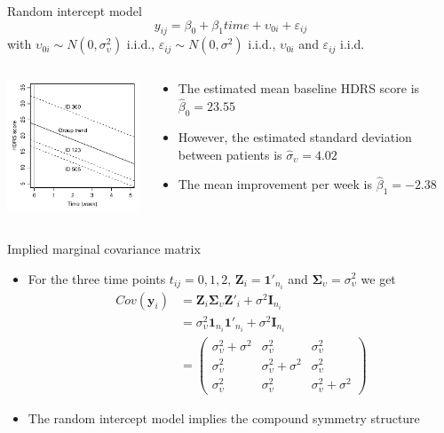 \documentclass[aspectratio=169]{beamer}
\newcommand{\vect}[1]{\mathbf{#1}}
\newcommand{\mat}[1]{\mathbf{#1}}
\newcommand{\gmat}[1]{\boldsymbol{#1}}
\begin{document}
\begin{frame}[fragile]{Random intercept model}
  \[
    y_{ij} = \beta_0 + \beta_1 time + \upsilon_{0i} + \varepsilon_{ij}
  \]
with $\upsilon_{0i} \sim N(0, \sigma^2_{\upsilon})$ i.i.d.,
$\varepsilon_{ij} \sim N(0, \sigma^2)$ i.i.d., $\upsilon_{0i}$ and
$\varepsilon_{ij}$ i.i.d.\\[2ex]
\begin{columns}
\begin{column}{.4\textwidth}
\includegraphics[width=5.5cm]{../figures/hdrs-lme1}
\end{column}
%
\begin{column}{.5\textwidth}
  \begin{itemize}
    \item The estimated mean baseline HDRS score is $\hat{\beta}_0 =
      23.55$
    \item However, the estimated standard deviation between patients is
      $\hat{\sigma}_\upsilon = 4.02$
    \item The mean improvement per week is $\hat{\beta}_1 = -2.38$
  \end{itemize}
  \vspace{1cm}
\end{column}
\end{columns}
\end{frame}

\begin{frame}{Implied marginal covariance matrix}
  \begin{itemize}
    \item For the three time points $t_{ij} = 0, 1, 2$, $\mat{Z}_i =
      \vect{1}'_{n_i}$ and $\gmat{\Sigma}_\upsilon = \sigma^2_\upsilon$ we
      get
\begin{align*}
  Cov(\vect{y}_i) &=
    \mat{Z}_i \gmat{\Sigma}_\upsilon \mat{Z}'_i + \sigma^2 \mat{I}_{n_i} \\
  &= \sigma^2_\upsilon \vect{1}_{n_i} \vect{1}'_{n_i} +
     \sigma^2 \mat{I}_{n_i} \\
  &= 
  \begin{pmatrix}
    \sigma^2_\upsilon + \sigma^2 & \sigma^2_\upsilon & \sigma^2_\upsilon \\
    \sigma^2_\upsilon & \sigma^2_\upsilon + \sigma^2 & \sigma^2_\upsilon \\
    \sigma^2_\upsilon & \sigma^2_\upsilon & \sigma^2_\upsilon + \sigma^2
  \end{pmatrix}
\end{align*}
\item The random intercept model implies the compound symmetry structure
  \end{itemize}
\end{frame}
\end{document}
